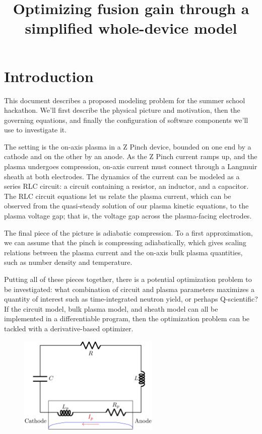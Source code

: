 \documentclass{article}
\title{Optimizing fusion gain through a simplified whole-device model}
\begin{document}
\maketitle

\section{Introduction}

This document describes a proposed modeling problem for the summer school hackathon.
We'll first describe the physical picture and motivation, then the governing equations, and finally
the configuration of software components we'll use to investigate it.

The setting is the on-axis plasma in a Z Pinch device, bounded on one end by a cathode and on the
other by an anode.
As the Z Pinch current ramps up, and the plasma undergoes compression, on-axis current must connect
through a Langmuir sheath at both electrodes.
The dynamics of the current can be modeled as a series RLC circuit: a circuit containing a resistor,
an inductor, and a capacitor.
The RLC circuit equations let us relate the plasma current, which can be observed from the quasi-steady 
solution of our plasma kinetic equations, to the plasma voltage gap; that is, the voltage gap
across the plasma-facing electrodes.

The final piece of the picture is adiabatic compression. To a first approximation, we can assume
that the pinch is compressing adiabatically, which gives scaling relations between the plasma current
and the on-axis bulk plasma quantities, such as number density and temperature.

Putting all of these pieces together, there is a potential optimization problem to be investigated:
what combination of circuit and plasma parameters maximizes a quantity of interest such as time-integrated
neutron yield, or perhaps Q-scientific?
If the circuit model, bulk plasma model, and sheath model can all be implemented in a differentiable
program, then the optimization problem can be tackled with a derivative-based optimizer.

\begin{figure}
    \centering
    \includegraphics[width=0.6\textwidth]{images/circuit_diagram.pdf}
\end{figure}
\end{document}

